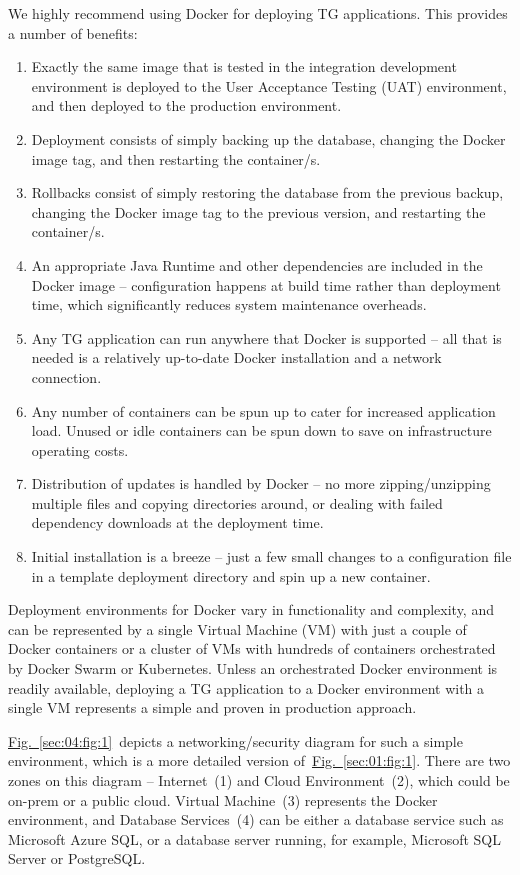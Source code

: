 \documentclass[a4paper,12pt,oneside,openright]{memoir}
\begin{document}
	We highly recommend using Docker for deploying TG applications.
	This provides a number of benefits:
\begin{enumerate}
	\item Exactly the same image that is tested in the integration development environment is deployed to the User Acceptance Testing (UAT) environment, and then deployed to the production environment.
	\item Deployment consists of simply backing up the database, changing the Docker image tag, and then restarting the container/s.
	\item Rollbacks consist of simply restoring the database from the previous backup, changing the Docker image tag to the previous version, and restarting the container/s.
	\item An appropriate Java Runtime and other dependencies are included in the Docker image -- configuration happens at build time rather than deployment time, which significantly reduces system maintenance overheads.
	\item Any TG application can run anywhere that Docker is supported -- all that is needed is a relatively up-to-date Docker installation and a network connection.
	\item Any number of containers can be spun up to cater for increased application load.
	      Unused or idle containers can be spun down to save on infrastructure operating costs.
	\item Distribution of updates is handled by Docker -- no more zipping/unzipping multiple files and copying directories around, or dealing with failed dependency downloads at the deployment time.
	\item Initial installation is a breeze -- just a few small changes to a configuration file in a template deployment directory and spin up a new container.
\end{enumerate}

	Deployment environments for Docker vary in functionality and complexity, and can be represented by a single Virtual Machine (VM) with just a couple of Docker containers or a cluster of VMs with hundreds of containers orchestrated by Docker Swarm or Kubernetes.
	Unless an orchestrated Docker environment is readily available, deploying a TG application to a Docker environment with a single VM represents a simple and proven in production approach.

	\hyperref[sec:04:fig:1]{Fig.~\ref*{sec:04:fig:1}}~depicts a networking/security diagram for such a simple environment, which is a more detailed version of~\hyperref[sec:01:fig:1]{Fig.~\ref*{sec:01:fig:1}}.
	There are two zones on this diagram -- Internet~(1) and Cloud Environment~(2), which could be on-prem or a public cloud.
	Virtual Machine~(3) represents the Docker environment, and Database Services~(4) can be either a database service such as Microsoft Azure SQL, or a database server running, for example, Microsoft SQL Server or PostgreSQL.
\end{document}
